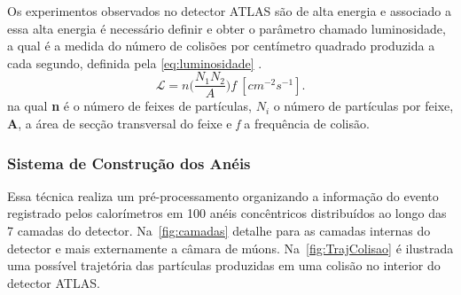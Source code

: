 
Os experimentos observados no detector ATLAS são de alta energia e associado a essa alta energia é necessário definir e obter o parâmetro chamado luminosidade, a qual é a medida do número de colisões por centímetro quadrado produzida a cada segundo, definida pela \autoref{eq:luminosidade} \cite{nobrega2013}.
\begin{equation}
   \mathcal{L} = n\Big(\frac{N_1N_2}{A}\Big)f \: [{cm^{-2}s^{-1}}]. \label{eq:luminosidade}
\end{equation}
na qual \textbf{n} é o número de feixes de partículas, $N_i$ o número de partículas por feixe, \textbf{A}, a área de secção transversal do feixe e \textit{f} a frequência de colisão.




\subsubsection{Sistema de Construção dos Anéis}

Essa técnica realiza um pré-processamento organizando a informação do evento registrado pelos calorímetros em 100 anéis concêntricos distribuídos ao longo das 7 camadas do detector. Na~\autoref{fig:camadas} detalhe para as camadas internas do detector e mais externamente a câmara de múons. Na~\autoref{fig:TrajColisao} é ilustrada uma possível trajetória das partículas produzidas em uma colisão no interior do detector ATLAS. 

